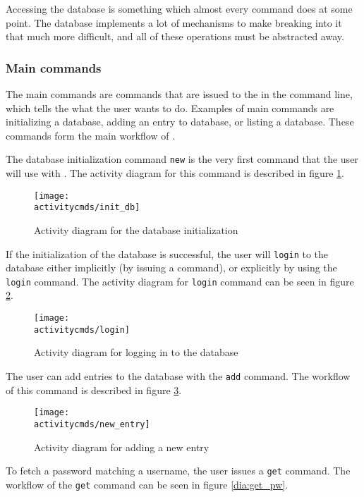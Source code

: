 Accessing the database is something which almost every command does at some
point. The database implements a lot of mechanisms to make breaking into it
that much more difficult, and all of these operations must be abstracted away.

\subsubsection{Main commands}

The main commands are commands that are issued to the \pman in the command line,
which tells the what the user wants to do. Examples of main commands are
initializing a database, adding an entry to database, or listing a database.
These commands form the main workflow of \pman.

The database initialization command \texttt{new} is the very first command
that the user will use with \pman. The activity diagram for this command is
described in figure \ref{dia:init_db}.

\begin{figure}[H]
    \centering
    \centerline{\texttt{[image: \\activitycmds/init\_db]}}
    \caption{Activity diagram for the database initialization}
    \label{dia:init_db}
\end{figure}

If the initialization of the database is successful, the user will
\texttt{login} to the database either implicitly (by issuing a command), or
explicitly by using the \texttt{login} command. The activity diagram for
\texttt{login} command can be seen in figure \ref{dia:login}.

\begin{figure}[H]
    \centering
    \centerline{\texttt{[image: \\activitycmds/login]}}
    \caption{Activity diagram for logging in to the database}
    \label{dia:login}
\end{figure}

The user can add entries to the database with the \texttt{add} command. The
workflow of this command is described in figure \ref{dia:new_entry}.

\begin{figure}[H]
    \centering
    \centerline{\texttt{[image: \\activitycmds/new\_entry]}}
    \caption{Activity diagram for adding a new entry}
    \label{dia:new_entry}
\end{figure}

To fetch a password matching a username, the user issues a \texttt{get} command.
The workflow of the \texttt{get} command can be seen in figure \ref{dia:get_pw}.

